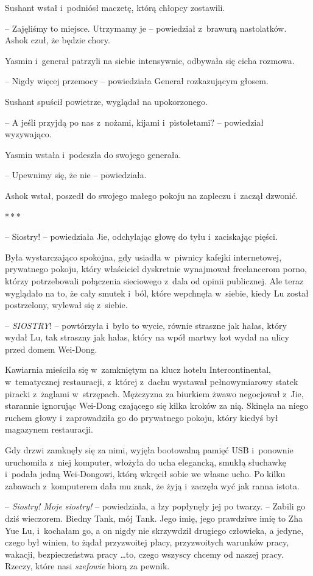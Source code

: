 \documentclass[oneside,polish,11pt,rmheadings]{mwbk}
\newcommand{\threeast}{\par\centerline{*\,*\,*}\medskip\par}
\begin{document}
Sushant wstał i~podniósł maczetę, którą chłopcy zostawili. 

-- Zajęliśmy to miejsce. Utrzymamy je -- powiedział z~brawurą nastolatków. Ashok czuł, że będzie chory.

Yasmin i~generał patrzyli na siebie intensywnie, odbywała się cicha rozmowa.

-- Nigdy więcej przemocy -- powiedziała Generał rozkazującym głosem.

Sushant spuścił powietrze, wyglądał na upokorzonego.

-- A jeśli przyjdą po nas z~nożami, kijami i~pistoletami? -- powiedział wyzywająco. 

Yasmin wstała i~podeszła do swojego generała. 

-- Upewnimy się, że nie -- powiedziała.

Ashok wstał, poszedł do swojego małego pokoju na zapleczu i~zaczął dzwonić.

\bigskip
\threeast

-- Siostry! -- powiedziała Jie, odchylając głowę do tyłu i~zaciskając pięści.

Była wystarczająco spokojna, gdy usiadła w~piwnicy kafejki internetowej, prywatnego pokoju, który właściciel dyskretnie wynajmował freelancerom porno, którzy potrzebowali połączenia sieciowego z~dala od opinii publicznej. Ale teraz wyglądało na to, że cały smutek i~ból, które wepchnęła w~siebie, kiedy Lu został postrzelony, wylewał się z~siebie.

-- \textit{SIOSTRY}! -- powtórzyła i~było to wycie, równie straszne jak hałas, który wydał Lu, tak straszny jak hałas, który na wpół martwy kot wydał na ulicy przed domem Wei-Dong.

Kawiarnia mieściła się w~zamkniętym na klucz hotelu Intercontinental, w~tematycznej restauracji, z~której z~dachu wystawał pełnowymiarowy statek piracki z~żaglami w~strzępach. Mężczyzna za biurkiem żwawo negocjował z~Jie, starannie ignorując Wei-Dong czającego się kilka kroków za nią. Skinęła na niego ruchem głowy i~zaprowadziła go do prywatnego pokoju, który kiedyś był magazynem restauracji.

Gdy drzwi zamknęły się za nimi, wyjęła bootowalną pamięć USB i~ponownie uruchomiła z~niej komputer, włożyła do ucha elegancką, smukłą słuchawkę i~podała jedną Wei-Dongowi, którą wkręcił sobie we własne ucho. Po kilku zabawach z~komputerem dała mu znak, że żyją i~zaczęła wyć jak ranna istota.

-- \textit{Siostry! Moje siostry! }-- powiedziała, a łzy popłynęły jej po twarzy. -- Zabili go dziś wieczorem. Biedny Tank, mój Tank. Jego imię, jego prawdziwe imię to Zha Yue Lu, i~kochałam go, a on nigdy nie skrzywdził drugiego człowieka, a jedyne, czego był winien, to żądał przyzwoitej płacy, przyzwoitych warunków pracy, wakacji, bezpieczeństwa pracy  \ldots  to, czego wszyscy chcemy od naszej pracy. Rzeczy, które nasi \textit{szefowie }biorą za pewnik.
\end{document}
